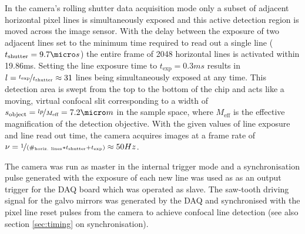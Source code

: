 \documentclass[12pt]{spieman}  %
\begin{document}
In the camera's rolling shutter data acquisition mode only a subset of adjacent horizontal pixel lines is simultaneously exposed and this active detection region is moved across the image sensor\cite{Baumgart2012}. With the delay between the exposure of two adjacent lines set to the minimum time required to read out a single line ($t_{\text{shutter}}=9.7\micro s$) the entire frame of 2048 horizontal lines is activated within 19.86ms. Setting the line exposure time to $t_{\text{exp}}=0.3ms$ results in $l=\nicefrac{t_{\text{exp}}}{t_{\text{shutter}}}\approx31$  lines being simultaneously exposed at any time. This detection area is swept from the top to the bottom of the chip and acts like a moving, virtual confocal slit corresponding to a width of $s_{\text{object}}=\nicefrac{l p}{M_{\text{eff}}}= 7.2 \micro m $ in the sample space, where $M_{\text{eff}}$ is the effective magnification of the detection objective. With the given values of line exposure and line read out time, the camera acquires images at a frame rate of $\nu = \nicefrac{1}{(\#_{\text{horiz. lines}}*t_{\text{shutter}}+t_{\text{exp}})} \approx 50Hz$. 

The camera was run as master in the internal trigger mode and a synchronisation pulse generated with the exposure of each new line was used as as an output trigger for the DAQ board which was operated as slave. The saw-tooth driving signal for the galvo mirrors was generated by the DAQ and synchronised with the pixel line reset pulses from the camera to achieve confocal line detection\cite{Baumgart2012} (see also section \ref{sec:timing} on synchronisation). %
 
\end{document}
